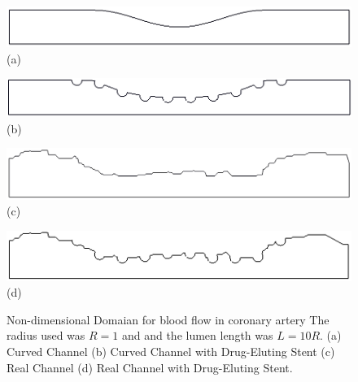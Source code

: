 \begin{figure}[H]
     \centering
     \begin{minipage}{.45\linewidth}
      \centering
      \includegraphics[scale=0.22]{./02_chaps/cap_solution/figure/Curved.png}\\
      (a)
     \end{minipage}%
     \begin{minipage}{.45\linewidth}
      \centering
      \includegraphics[scale=0.22]{./02_chaps/cap_solution/figure/CurvedStrut.png}\\
      (b)
     \end{minipage}
     \begin{minipage}{.45\linewidth}
      \centering
      \includegraphics[scale=0.16]{./02_chaps/cap_solution/figure/Real.png}\\
      (c)
     \end{minipage}%
     \begin{minipage}{.45\linewidth}
      \centering
      \includegraphics[scale=0.22]{./02_chaps/cap_solution/figure/RealStrut.png}\\
      (d)
     \end{minipage}
     \medskip
     \caption{Non-dimensional Domaian for blood flow in coronary artery
     The radius used was $R=1$ and and the lumen length was $L=10R$.
     (a) Curved Channel
     (b) Curved Channel with Drug-Eluting Stent
     (c) Real Channel
     (d) Real Channel with Drug-Eluting Stent.}
     \label{coronary artery geo}
\end{figure}
